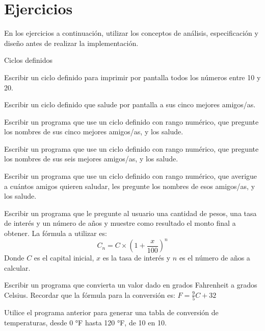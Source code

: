 \newpage
\section{Ejercicios}
En los ejercicios a continuación, utilizar los conceptos de análisis,
especificación y diseño antes de realizar la implementación.

\begin{ejercicio} Ciclos definidos
\begin{partes}
	\item Escribir un ciclo definido para imprimir por pantalla
todos los números entre 10 y 20.
	\item Escribir un ciclo definido que salude por pantalla a
sus cinco mejores amigos/as.
	\item Escribir un programa que use un ciclo definido con
rango numérico, que pregunte los nombres de sus cinco mejores
amigos/as, y los salude.
	\item Escribir un programa que use un ciclo definido con
rango numérico, que pregunte los nombres de sus seis mejores
amigos/as, y los salude.
	\item Escribir un programa que use un ciclo definido con
rango numérico, que averigue a cuántos amigos quieren saludar, les
pregunte los nombres de esos amigos/as, y los salude.
\end{partes}
\end{ejercicio}

\begin{ejercicio}
Escribir un programa que le pregunte al usuario una cantidad de pesos,
una tasa de interés y un número de años y muestre como resultado el monto
final a obtener.  La fórmula a utilizar es:
\begin{displaymath}
C_n = C \times (1+\frac{x}{100})^n
\end{displaymath}
Donde $C$ es el capital inicial, $x$ es la tasa de interés y $n$ es el
número de años a calcular.
\end{ejercicio}

\begin{ejercicio}
Escribir un programa que convierta un valor dado en grados Fahrenheit a
grados Celsius.  Recordar que la fórmula para la conversión es:
$F = \frac{9}{5}C+32$
\end{ejercicio}

\begin{ejercicio}
Utilice el programa anterior para generar una tabla de conversión de
temperaturas, desde 0 °F hasta 120 °F, de 10 en 10.
\end{ejercicio}

